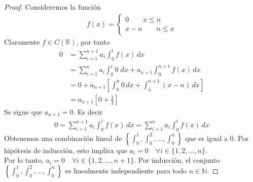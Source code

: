 \documentclass[11pt,letterpaper]{article}
\newcommand{\R}{\mathbb{R}}
\newcommand{\N}{\mathbb{N}}
\begin{document}
\begin{proof}
    Consideremos la función
    \begin{align*}
        f(x)=
        \begin{cases}
            0 \quad \quad x\leq n\\
            x-n \quad  \quad n\leq x
        \end{cases}
    \end{align*}
    Claramente $f\in C(\R)$, por tanto
    \begin{align*}
        0&=\sum_{i=1}^{n+1} a_i \int_0^i f(x) \, dx \\
        &= \sum_{i=1}^{n} a_i \int_0^i 0 \; dx + a_{n+1}\int_0^{n+1}f(x) \, dx\\
        &=0+a_{n+1} \left[\int_0^n 0 \, dx + \int_n^{n+1} (x-n) \, dx\right] \\
        &=a_{n+1}\left[0+\frac{1}{2}\right]
    \end{align*}
    Se sigue que $a_{n+1}=0$. Es decir 
    \begin{align*}
        0=\sum_{i=1}^{n+1} a_i \int_0^i f(x) \, dx=\sum_{i=1}^{n} a_i \int_0^i f(x) \, dx
    \end{align*}
    Obtenemos una combinación lineal de $\left\{ \int_0^1, \int_0^2, \dots, \int_0^n \right\}$ 
    que es igual a $0$. Por hipótesis de inducción, esto implica que $a_i = 0 \quad \forall i \in \{1, 2, \dots, n\}$.\\ [10pt]
    Por lo tanto, $a_i = 0 \quad \forall i \in \{1, 2, \dots, n+1\}$.
    Por inducción, el conjunto $\left\{ \int_0^1, \int_0^2, \dots, \int_0^n \right\}$ es linealmente independiente para todo $n \in \N$.
\end{proof}
\end{document}
